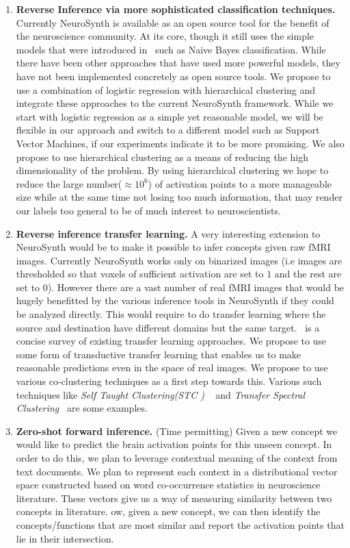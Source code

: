 \documentclass[11pt]{article}
\begin{document}
\begin{enumerate}

    \item {\bf Reverse Inference via more sophisticated classification techniques.} Currently NeuroSynth is available as an open source tool for the benefit of the neuroscience community. At its core, though it still uses the simple models that were introduced in~\cite{yarkoni2011large} such as Naive Bayes classification. While there have been other approaches that have used more powerful models, they have not been implemented concretely as open source tools. We propose to use a combination of logistic regression with hierarchical clustering and integrate these approaches to the current NeuroSynth framework. While we start with logistic regression as a simple yet reasonable model, we will be flexible in our approach and switch to a different model such as Support Vector Machines, if our experiments indicate it to be more promising. We also propose to use hierarchical clustering as a means of reducing the high dimensionality of the problem. By using hierarchical clustering we hope to reduce the large number($\approx 10^6$) of activation points to a more manageable size while at the same time not losing too much information, that may render our labels too general to be of much interest to neuroscientists.

    \item {\bf Reverse inference transfer learning.} A very interesting extension to NeuroSynth would be to make it possible to infer concepts given raw fMRI images. Currently NeuroSynth works only on binarized images (i.e images are thresholded so that voxels of sufficient activation are set to $1$ and the rest are set to $0$). However there are a vast number of real fMRI images that would be hugely benefitted by the various inference tools in NeuroSynth if they could be analyzed directly. This would require to do transfer learning where the source and destination have different domains but the same target.~\cite{pan2010survey,taylor2009transfer} is a concise survey of existing transfer learning approaches. We propose to use some form of transductive transfer learning that enables us to make reasonable predictions even in the space of real images. We propose to use various co-clustering techniques as a first step towards this. Various such techniques like \emph{Self Taught Clustering(STC )} ~\cite{dai2008self} and \emph{Transfer Spectral Clustering}~\cite{jiang2012transfer} are some examples.

    \item {\bf Zero-shot forward inference.}
 (Time permitting)  Given a new concept we would like to predict the brain activation points for this unseen concept. In order to do this, we plan to leverage contextual meaning of the context from text documents. We plan to represent each context in a distributional vector space constructed based on word co-occurrence statistics in neuroscience literature. These vectors give us a way of measuring similarity between two concepts in literature. ow, given a new concept, we can then identify the concepts/functions that are most similar and report the activation points that lie in their intersection.


\end{enumerate}
\end{document}
